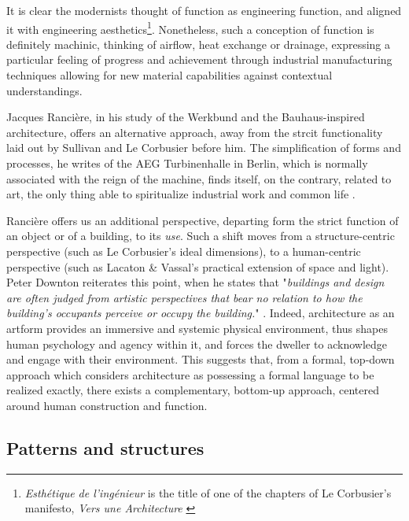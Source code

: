 It is clear the modernists thought of function as engineering function, and aligned it with engineering aesthetics\footnote{\emph{Esthétique de l'ingénieur} is the title of one of the chapters of Le Corbusier's manifesto, \emph{Vers une Architecture} \citep{lecorbusier_vers_1923}}. Nonetheless, such a conception of function is definitely machinic, thinking of airflow, heat exchange or drainage, expressing a particular feeling of progress and achievement through industrial manufacturing techniques allowing for new material capabilities against contextual understandings.

Jacques Rancière, in his study of the Werkbund and the Bauhaus-inspired architecture, offers an alternative approach, away from the strcit functionality laid out by Sullivan and Le Corbusier before him. The simplification of forms and processes, he writes of the AEG Turbinenhalle in Berlin, which is normally associated with the reign of the machine, finds itself, on the contrary, related to art, the only thing able to spiritualize industrial work and common life \citep{ranciere_aisthesis_2013}.

Rancière offers us an additional perspective, departing form the strict function of an object or of a building, to its \emph{use}. Such a shift moves from a structure-centric perspective (such as Le Corbusier's ideal dimensions), to a human-centric perspective (such as Lacaton \& Vassal's practical extension of space and light). Peter Downton reiterates this point, when he states that "\emph{buildings and design are often judged from artistic perspectives that bear no relation to how the building’s occupants perceive or occupy the building.}" \citep{downton_knowledge_1998}. Indeed, architecture as an artform provides an immersive and systemic physical environment, thus shapes human psychology and agency within it, and forces the dweller to acknowledge and engage with their environment. This suggests that, from a formal, top-down approach which considers architecture as possessing a formal language to be realized exactly, there exists a complementary, bottom-up approach, centered around human construction and function.


\subsection{Patterns and structures}
\label{subsec:patterns-structures}

